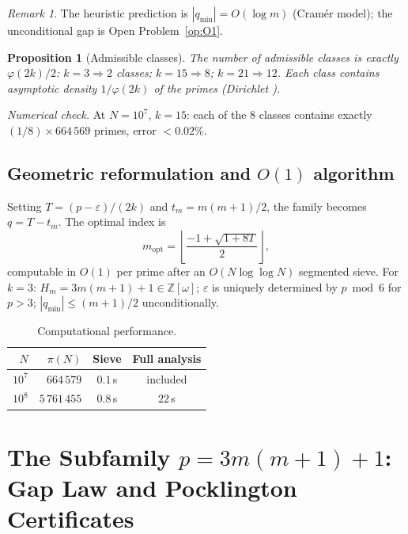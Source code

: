 \documentclass[11pt,a4paper]{article}
\newtheorem{proposition}[theorem]{Proposition}
\theoremstyle{definition}
\theoremstyle{remark}
\newtheorem{remark}[theorem]{Remark}
\newcommand{\Z}{\mathbb{Z}}
\newcommand{\qmin}{q_{\min}}
\newcommand{\eps}{\varepsilon}
\begin{document}
\begin{remark}
The heuristic prediction is $|\qmin|=O(\log m)$ (Cram\'er model);
the unconditional gap is Open Problem~\ref{op:O1}.
\end{remark}

\begin{rigorousbox}
\begin{proposition}[Admissible classes]\label{prop:classes}
The number of admissible classes is exactly $\varphi(2k)/2$:
$k=3\Rightarrow 2$ classes; $k=15\Rightarrow 8$; $k=21\Rightarrow 12$.
Each class contains asymptotic density $1/\varphi(2k)$ of the primes
(Dirichlet \cite{Dirichlet1837}).
\end{proposition}
\end{rigorousbox}

\noindent\emph{Numerical check.} At $N=10^{7}$, $k=15$: each of the
$8$ classes contains exactly $(1/8)\times 664\,569$ primes, error
$<0.02\%$.

\subsection{Geometric reformulation and $O(1)$ algorithm}

Setting $T=(p-\eps)/(2k)$ and $t_{m}=m(m+1)/2$, the family becomes
$q=T-t_{m}$. The optimal index is
\[
  m_{\text{opt}}=\left\lfloor\frac{-1+\sqrt{1+8T}}{2}\right\rfloor,
\]
computable in $O(1)$ per prime after an $O(N\log\log N)$ segmented
sieve. For $k=3$: $H_{m}=3m(m+1)+1\in\Z[\omega]$; $\eps$ is uniquely
determined by $p\bmod 6$ for $p>3$; $|\qmin|\le(m+1)/2$
unconditionally.

\begin{table}[ht]\centering
\caption{Computational performance.}
\begin{tabular}{@{}rrcc@{}}
\toprule
$N$ & $\pi(N)$ & Sieve & Full analysis \\
\midrule
$10^{7}$ & $664\,579$ & $0.1$\,s & included \\
$10^{8}$ & $5\,761\,455$ & $0.8$\,s & $22$\,s \\
\bottomrule
\end{tabular}
\end{table}

\section{The Subfamily $p=3m(m+1)+1$:\\ Gap Law and Pocklington Certificates}
\label{sec:subfamily}
\end{document}
